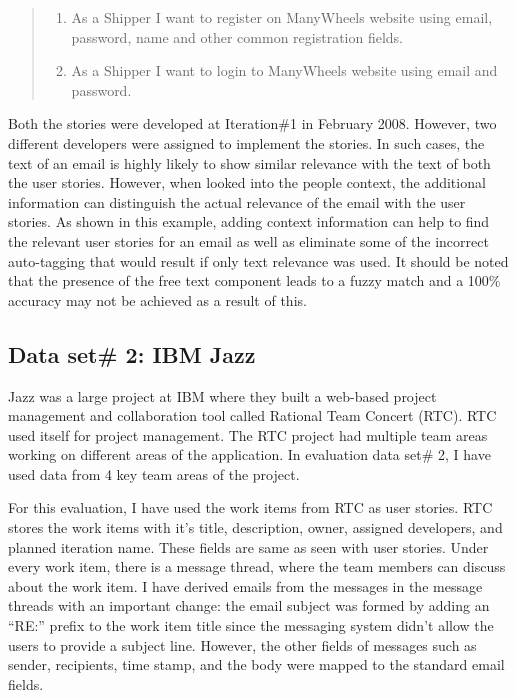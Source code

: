 \begin{quote}
	\begin{enumerate}
		\item As a Shipper I want to register on ManyWheels website using email, password, name and other common registration fields.
		\item As a Shipper I want to login to ManyWheels website using email and password.
	\end{enumerate}
\end{quote}

Both the stories were developed at Iteration\#1 in February 2008. However, two different developers were assigned to implement the stories. In such cases, the text of an email is highly likely to show similar relevance with the text of both the user stories. However, when looked into the people context, the additional information can distinguish the actual relevance of the email with the user stories. As shown in this example, adding context information can help to find the relevant user stories for an email as well as eliminate some of the incorrect auto-tagging that would result if only text relevance was used. It should be noted that the presence of the free text component leads to a fuzzy match and a 100\% accuracy may not be achieved as a result of this.

\subsection{Data set\# 2: IBM Jazz}
Jazz was a large project at IBM where they built a web-based project management and collaboration tool called Rational Team Concert (RTC). RTC used itself for project management. The RTC project had multiple team areas working on different areas of the application. In evaluation data set\# 2, I have used data from 4 key team areas of the project.

For this evaluation, I have used the work items from RTC as user stories. RTC stores the work items with it's title, description, owner, assigned developers, and planned iteration name. These fields are same as seen with user stories. Under every work item, there is a message thread, where the team members can discuss about the work item. I have derived emails from the messages in the message threads with an important change: the email subject was formed by adding an ``RE:'' prefix to the work item title since the messaging system didn't allow the users to provide a subject line. However, the other fields of messages such as sender, recipients, time stamp, and the body were mapped to the standard email fields.

